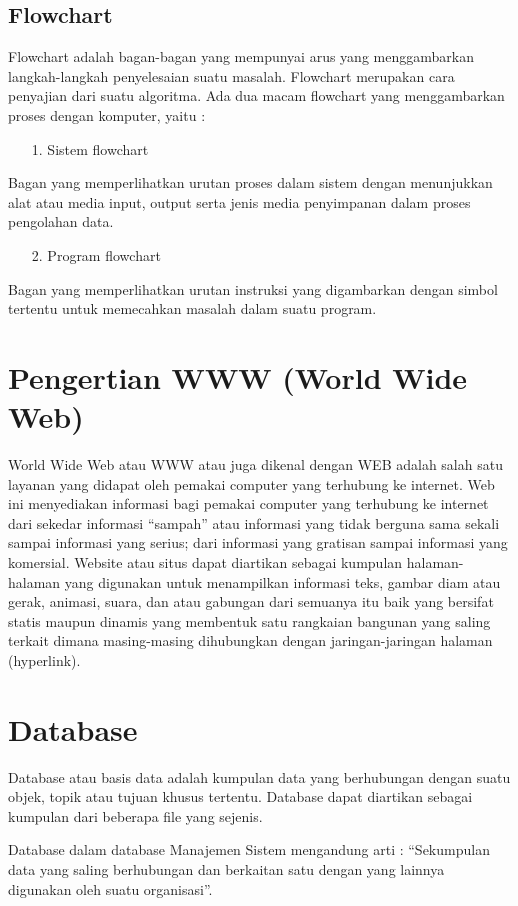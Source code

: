 \documentclass{jtetiproposalskripsi}
\begin{document}
\subsection{Flowchart}
Flowchart adalah bagan-bagan yang mempunyai arus yang menggambarkan langkah-langkah penyelesaian suatu masalah. Flowchart merupakan cara penyajian dari suatu algoritma.
Ada dua macam flowchart yang menggambarkan proses dengan komputer, yaitu :

\begin{itemize}
\item[1.] Sistem flowchart
\end{itemize}
Bagan yang memperlihatkan urutan proses dalam sistem dengan menunjukkan alat atau media input, output serta jenis media penyimpanan dalam proses pengolahan data.
\begin{itemize}
\item[2.] Program flowchart
\end{itemize}
Bagan yang memperlihatkan urutan instruksi yang digambarkan dengan simbol tertentu untuk memecahkan masalah dalam suatu program.

\section{Pengertian WWW (World Wide Web)}
World Wide Web atau WWW atau juga dikenal dengan WEB adalah salah satu layanan yang didapat oleh pemakai computer yang terhubung ke internet. Web ini menyediakan informasi bagi pemakai computer yang terhubung ke internet dari sekedar informasi “sampah” atau informasi yang tidak berguna sama sekali sampai informasi yang serius; dari informasi yang gratisan sampai informasi yang komersial. Website atau situs dapat diartikan sebagai kumpulan halaman-halaman yang digunakan untuk menampilkan informasi teks, gambar diam atau gerak, animasi, suara, dan atau gabungan dari semuanya itu baik yang bersifat statis maupun dinamis yang membentuk satu rangkaian bangunan yang saling terkait dimana masing-masing dihubungkan dengan jaringan-jaringan halaman (hyperlink).

\section{Database}
Database atau basis data adalah kumpulan data yang berhubungan dengan suatu objek, topik atau tujuan khusus tertentu. Database dapat diartikan sebagai kumpulan dari beberapa file yang sejenis.

Database dalam database Manajemen Sistem mengandung arti : “Sekumpulan data yang saling berhubungan dan berkaitan satu dengan yang lainnya digunakan oleh suatu organisasi”.
\end{document}
